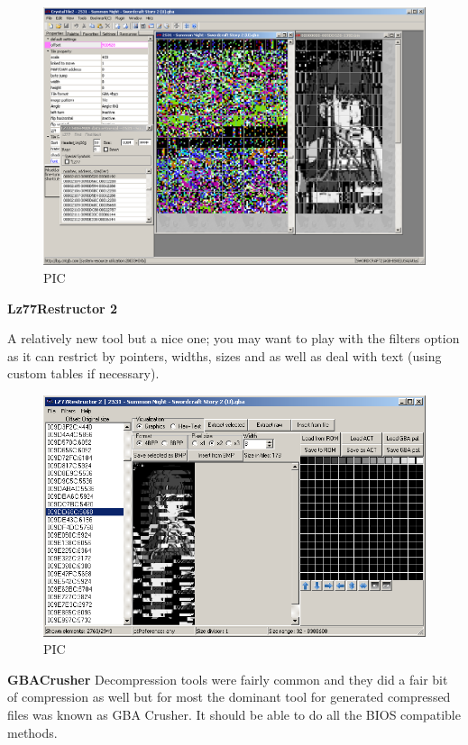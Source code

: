 \documentclass[
]{book}
\begin{document}
\begin{figure}
\centering
\includegraphics{images/189_home_fast6191_romhackingguide_unrenamed_fil___ingguidecompressionsearching_crystaltile2_2.png}
\caption{PIC}
\end{figure}

\textbf{Lz77Restructor 2}

A relatively new tool but a nice one; you may want to play with the filters option as it can restrict by pointers, widths, sizes and as well as deal with text (using custom tables if necessary).

\begin{figure}
\centering
\includegraphics{images/190_home_fast6191_romhackingguide_unrenamed_fil___gguidecompressionsearching_LZ77restructor_1.png}
\caption{PIC}
\end{figure}

\textbf{GBACrusher} Decompression tools were fairly common and they did a fair bit of compression as well but for most the dominant tool for generated compressed files was known as GBA Crusher. It should be able to do all the BIOS compatible methods.
\end{document}
